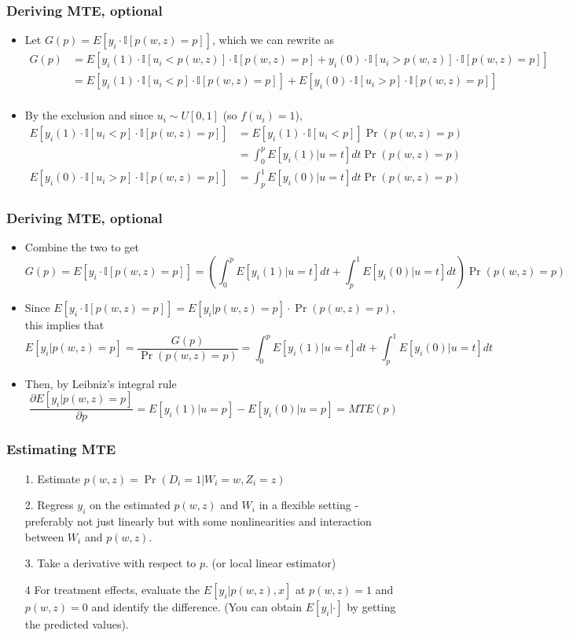 \documentclass[aspectratio=169]{beamer}
\begin{document}
\begin{frame}
\frametitle{Deriving MTE, optional}
\begin{itemize}
\item Let $G(p)=E[y_i\cdot \mathbb{I}[p(w,z)=p]]$, which we can rewrite as
\[
\begin{aligned}
G(p)&=E[y_i(1)\cdot \mathbb{I}[u_i<p(w,z)]\cdot \mathbb{I}[p(w,z)=p]+y_i(0)\cdot \mathbb{I}[u_i>p(w,z)]\cdot \mathbb{I}[p(w,z)=p]]\\
&=E[y_i(1)\cdot \mathbb{I}[u_i<p]\cdot \mathbb{I}[p(w,z)=p]]+E[y_i(0)\cdot \mathbb{I}[u_i>p]\cdot \mathbb{I}[p(w,z)=p]]\\
\end{aligned}
\]
\item By the exclusion and since $u_i\sim U[0,1]$ (so $f(u_i)=1$), 
\[
\begin{aligned}
E[y_i(1)\cdot \mathbb{I}[u_i<p]\cdot \mathbb{I}[p(w,z)=p]]&=E[y_i(1)\cdot \mathbb{I}[u_i<p]]\Pr(p(w,z)=p)\\
&=\int_0^pE[y_i(1)|u=t]dt\Pr(p(w,z)=p)\\
E[y_i(0)\cdot \mathbb{I}[u_i>p]\cdot \mathbb{I}[p(w,z)=p]]&=\int_p^1E[y_i(0)|u=t]dt\Pr(p(w,z)=p)
\end{aligned}
\]
\end{itemize}
\end{frame}

\begin{frame}
\frametitle{Deriving MTE, optional}
\begin{itemize}
\item Combine the two to get
\small{\[
G(p)=E[y_i\cdot \mathbb{I}[p(w,z)=p]]=\left(\int_0^pE[y_i(1)|u=t]dt+\int_p^1E[y_i(0)|u=t]dt\right)\Pr(p(w,z)=p)
\]}\normalsize
\item Since  $E[y_i\cdot \mathbb{I}[p(w,z)=p]]=E[y_i|p(w,z)=p]\cdot \Pr(p(w,z)=p) $, this implies that
\footnotesize{\[
E[y_i|p(w,z)=p]=\frac{G(p)}{\Pr(p(w,z)=p)}=\int_0^pE[y_i(1)|u=t]dt+\int_p^1E[y_i(0)|u=t]dt
\]}\normalsize
\item Then, by Leibniz's integral rule
\[
\frac{\partial E[y_i | p(w,z)=p]}{\partial p}=E[y_i(1)|u=p]-E[y_i(0)|u=p]=MTE(p)
\]
\end{itemize}
\end{frame}

\begin{frame}
\frametitle{Estimating MTE}
\begin{itemize}
\item[1.] Estimate $p(w,z)=\Pr(D_i=1|W_i=w, Z_i=z)$
\item[2.] Regress $y_i$ on the estimated $p(w, z)$ and $W_i$ in a flexible setting - preferably not just linearly but with some nonlinearities and interaction between $W_i$ and $p(w,z)$. 
\item[3.] Take a derivative with respect to $p$. (or local linear estimator)
\item[4] For treatment effects, evaluate the $E[y_i|p(w,z),x]$ at $p(w,z)=1$ and $p(w,z)=0$ and identify the difference. (You can obtain $E[y_i|\cdot]$ by getting the predicted values).  
\end{itemize}
\end{frame}
\end{document}
